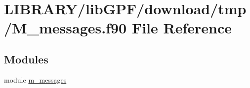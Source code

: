\hypertarget{M__messages_8f90}{}\section{L\+I\+B\+R\+A\+R\+Y/lib\+G\+P\+F/download/tmp/\+M\+\_\+messages.f90 File Reference}
\label{M__messages_8f90}
\subsection*{Modules}
\begin{DoxyCompactItemize}
\item 
module \hyperlink{namespacem__messages}{m\+\_\+messages}
\end{DoxyCompactItemize}

